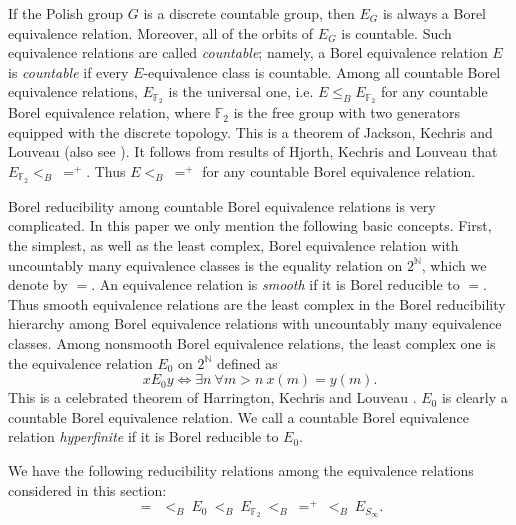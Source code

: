 \documentclass{amsart}
\theoremstyle{definition}
\theoremstyle{problem}
\theoremstyle{remark}
\numberwithin{equation}{section}
\begin{document}
If the Polish group $G$ is a discrete countable group, then $E_G$ is always a Borel equivalence relation. Moreover, all of the orbits of $E_G$ is countable. Such equivalence relations are called {\em countable}; namely, a Borel equivalence relation $E$ is {\em countable} if every $E$-equivalence class is countable. Among all countable Borel equivalence relations, $E_{\mathbb{F}_2}$ is the universal one, i.e. $E\leq_B E_{\mathbb{F}_2}$ for any countable Borel equivalence relation, where $\mathbb{F}_2$ is the free group with two generators equipped with the discrete topology. This is a theorem of Jackson, Kechris and Louveau \cite{JKL} (also see \cite[Theorem 7.3.8]{GaoBook}). It follows from results of Hjorth, Kechris and Louveau \cite{HKL} that $E_{\mathbb{F}_2}<_B\ =^+$. Thus $E<_B\ =^+$ for any countable Borel equivalence relation. 

Borel reducibility among countable Borel equivalence relations is very complicated. In this paper we only mention the following basic concepts. First, the simplest, as well as the least complex, Borel equivalence relation with uncountably many equivalence classes is the equality relation on $2^\mathbb{N}$, which we denote by $=$. An equivalence relation is {\em smooth} if it is Borel reducible to $=$. Thus smooth equivalence relations are the least complex in the Borel reducibility hierarchy among Borel equivalence relations with uncountably many equivalence classes. Among nonsmooth Borel equivalence relations, the least complex one is the equivalence relation $E_0$ on $2^\mathbb{N}$ defined as
$$ xE_0 y\iff \exists n\ \forall m>n\ x(m)=y(m). $$
This is a celebrated theorem of Harrington, Kechris and Louveau \cite{HaKL}. $E_0$ is clearly a countable Borel equivalence relation. We call a countable Borel equivalence relation {\em hyperfinite} if it is Borel reducible to $E_0$.

We have the following reducibility relations among the equivalence relations considered in this section:
$$ =\ \ <_B\ E_0\ <_B\ E_{\mathbb{F}_2}\ <_B\ =^+\ <_B\ E_{S_\infty}. $$
\end{document}
